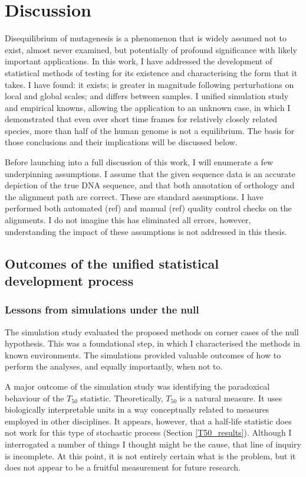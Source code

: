\chapter{Discussion}

Disequilibrium of mutagenesis is a phenomenon that is widely assumed not to exist, almost never examined, but potentially of profound significance with likely important applications. In this work, I have addressed the development of statistical methods of testing for its existence and characterising the form that it takes. I have found: it exists; is greater in magnitude following perturbations on local and global scales; and differs between samples. I unified simulation study and empirical knowns, allowing the application to an unknown case, in which I demonstrated that even over short time frames for relatively closely related species, more than half of the human genome is not a equilibrium. The basis for those conclusions and their implications will be discussed below. 

Before launching into a full discussion of this work, I will enumerate a few underpinning assumptions. I assume that the given sequence data is an accurate depiction of the true DNA sequence, and that both annotation of orthology and the alignment path are correct. These are standard assumptions. I have performed both automated (ref) and manual (ref) quality control checks on the alignments. I do not imagine this has eliminated all errors, however, understanding the impact of these assumptions is not addressed in this thesis. 

\section{Outcomes of the unified statistical development process}

\subsection{Lessons from simulations under the null}
The simulation study evaluated the proposed methods on corner cases of the null hypothesis. This was a foundational step, in which I characterised the methods in known environments. The simulations provided valuable outcomes of how to perform the analyses, and equally importantly, when not to. 

A major outcome of the simulation study was identifying the paradoxical behaviour of the $T_{50}$ statistic. Theoretically, $T_{50}$ is a natural measure. It uses biologically interpretable units in a way conceptually related to measures employed in other disciplines. It appears, however, that a half-life statistic does not work for this type of stochastic process (Section \ref{T50_results}). Although I interrogated a number of things I thought might be the cause, that line of inquiry is incomplete. At this point, it is not entirely certain what is the problem, but it does not appear to be a fruitful measurement for future research. 

